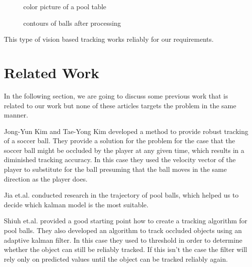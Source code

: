 \documentclass[notitlepage, a4paper, 11pt]{scrartcl}
\begin{document}
\begin{multicols}{2}
\begin{figure}[H]
    \centering
    \caption{color picture of a pool table}
    \label{pic:pool-color}
\end{figure}

\begin{figure}[H]
    \centering
    \caption{contours of balls after processing}
    \label{pic:pool-bw}
\end{figure}

This type of vision based tracking works reliably for our requirements.

\section{Related Work}

In the following section, we are going to discuss some previous work that is related to our work but none of these articles targets the problem in the same manner.

Jong-Yun Kim and Tae-Yong Kim \cite{kim} developed a method to provide robust tracking of a soccer ball. 
They provide a solution for the problem for the case that the soccer ball might be occluded by the player at any given time,
which results in a diminished tracking accuracy. 
In this case they used the velocity vector of the player to substitute for the ball presuming that the ball moves in the same direction as the player does.

Jia et.al. \cite{jia} conducted research in the trajectory of pool balls, which helped us to decide which kalman model is the most suitable.

Shiuh et.al. \cite{shiuh} provided a good starting point how to create a tracking algorithm for pool balls. They also developed an algorithm to track occluded objects using an adaptive kalman filter.
In this case they used to threshold in order to determine whether the object can still be reliably tracked. If this isn't the case the filter will rely only on predicted values until the object can be tracked reliably again.


\end{multicols}
\end{document}
